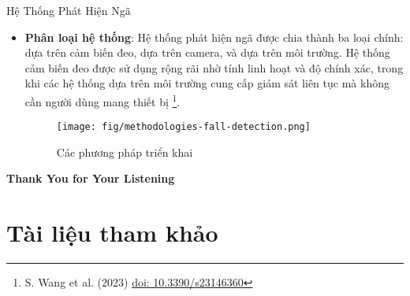 \documentclass{beamer}
\newcommand*{\doi}[1]{\href{http://dx.doi.org/#1}{doi: #1}}
\begin{document}
\begin{frame}{Hệ Thống Phát Hiện Ngã}

    \begin{itemize}
    \item \textbf{Phân loại hệ thống}: Hệ thống phát hiện ngã được chia thành ba loại chính: dựa trên cảm biến đeo, dựa trên camera, và dựa trên môi trường. Hệ thống cảm biến đeo được sử dụng rộng rãi nhờ tính linh hoạt và độ chính xác, trong khi các hệ thống dựa trên môi trường cung cấp giám sát liên tục mà không cần người dùng mang thiết bị \footnote{S. Wang et al. (2023) \doi{10.3390/s23146360}}.
    \begin{figure}
        \centering
        \texttt{[image: fig/methodologies-fall-detection.png]}
        \caption{Các phương pháp triển khai}
        \label{fig:lstm}
    \end{figure}
    \end{itemize}
\end{frame}


\begin{frame}{}
  \centering \Huge
  \textbf{Thank You for Your Listening}
\end{frame}

\section{Tài liệu tham khảo}
\end{document}
